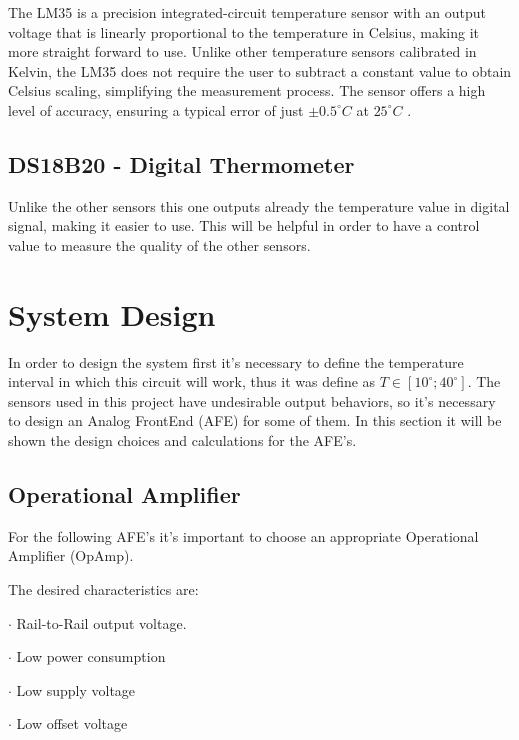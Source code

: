 \documentclass[12pt]{article}
\begin{document}
    The LM35 is a precision integrated-circuit temperature sensor with an output voltage that is linearly proportional to the temperature in Celsius, making it more straight forward to use. Unlike other temperature sensors calibrated in Kelvin, the LM35 does not require the user to subtract a constant value to obtain Celsius scaling, simplifying the measurement process. The sensor offers a high level of accuracy, ensuring a typical error of just $\pm 0.5^\circ C$ at $25^\circ C$ \cite{LM35_datasheet} .

\subsection{DS18B20 - Digital Thermometer}

    Unlike the other sensors this one outputs already the temperature value in digital signal, making it easier to use. This will be helpful in order to have a control value to measure the quality of the other sensors.

\newpage
\section{System Design}

    In order to design the system first it's necessary to define the temperature interval in which this circuit will work, thus it was define as $T \in [ 10^{\circ}; 40^{\circ} ]$. 
    The sensors used in this project have undesirable output behaviors, so it's necessary to design an Analog FrontEnd (AFE) for some of them. In this section it will be shown the design choices and calculations for the AFE's.

\subsection{Operational Amplifier}
          
    For the following AFE's it's important to choose an appropriate Operational Amplifier (OpAmp). 

    The desired characteristics are:

    $\cdot$ Rail-to-Rail output voltage.
    
    $\cdot$ Low power consumption
    
    $\cdot$ Low supply voltage

    $\cdot$ Low offset voltage
\end{document}

